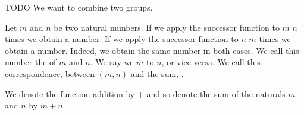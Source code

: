 
\sbasic







\sstart
{}


TODO
We want to combine two groups.


Let $m$ and $n$ be two natural numbers.
If we apply the successor function to $m$ $n$
times we obtain a number.
If we apply the successor function to $n$ $m$
times we obtain a number.
Indeed, we obtain the same number in both cases.
We call this number the 
of $m$ and $n$.
We say we  $m$ to $n$,
or vice versa.
We call this correspondence, between
$(m, n)$ and the sum, .


We denote the function addition by $+$
and so denote the sum of the naturals
$m$ and $n$ by $m + n$.
\strats
